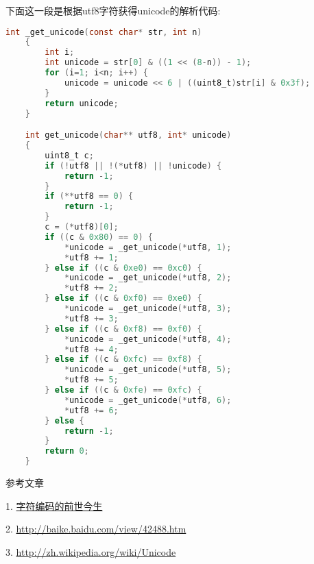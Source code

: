 {\begin{itemize}
{        {下面这一段是根据utf8字符获得unicode的解析代码:}\par
        \begin{lstlisting}[language=C]
    int _get_unicode(const char* str, int n)
    {
        int i;
        int unicode = str[0] & ((1 << (8-n)) - 1);
        for (i=1; i<n; i++) {
            unicode = unicode << 6 | ((uint8_t)str[i] & 0x3f);
        }
        return unicode;
    }

    int get_unicode(char** utf8, int* unicode)
    {
        uint8_t c;
        if (!utf8 || !(*utf8) || !unicode) {
            return -1;
        }
        if (**utf8 == 0) {
            return -1;
        }
        c = (*utf8)[0];
        if ((c & 0x80) == 0) {
            *unicode = _get_unicode(*utf8, 1);
            *utf8 += 1;
        } else if ((c & 0xe0) == 0xc0) {
            *unicode = _get_unicode(*utf8, 2);
            *utf8 += 2;
        } else if ((c & 0xf0) == 0xe0) {
            *unicode = _get_unicode(*utf8, 3);
            *utf8 += 3;
        } else if ((c & 0xf8) == 0xf0) {
            *unicode = _get_unicode(*utf8, 4);
            *utf8 += 4;
        } else if ((c & 0xfc) == 0xf8) {
            *unicode = _get_unicode(*utf8, 5);
            *utf8 += 5;
        } else if ((c & 0xfe) == 0xfc) {
            *unicode = _get_unicode(*utf8, 6);
            *utf8 += 6;
        } else {
            return -1;
        }
        return 0;
    }
        \end{lstlisting}
    }
    \end{itemize}
}

{\ZHH 参考文章}\par
{1. \href{http://djt.qq.com/article/view/658?ADTAG=email.InnerAD.weekly.20130902}{字符编码的前世今生}}\par
{2. \href{http://baike.baidu.com/view/42488.htm}{http://baike.baidu.com/view/42488.htm}}\par
{3. \href{http://zh.wikipedia.org/wiki/Unicode}{http://zh.wikipedia.org/wiki/Unicode}}\par


